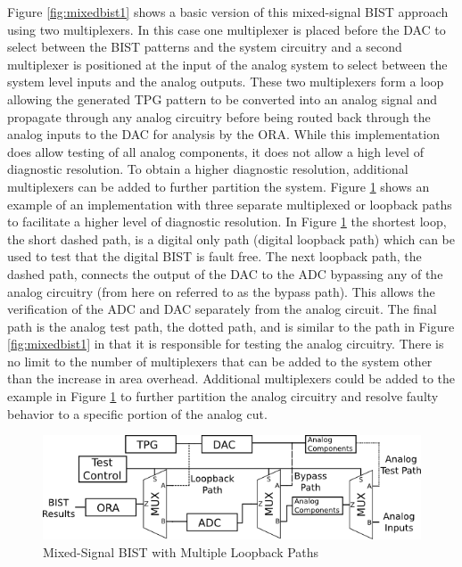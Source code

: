 \documentclass[12pt]{report}
\begin{document}
Figure \ref{fig:mixedbist1} shows a basic version of this mixed-signal BIST approach using two multiplexers.  In this case one multiplexer is placed before the DAC to select between the BIST patterns and the system circuitry and a second multiplexer is positioned at the input of the analog system to select between the system level inputs and the analog outputs.  These two multiplexers form a loop allowing the generated TPG pattern to be converted into an analog signal and propagate through any analog circuitry before being routed back through the analog inputs to the DAC for analysis by the ORA.  While this implementation does allow testing of all analog components, it does not allow a high level of diagnostic resolution\cite{syschip}.  To obtain a higher diagnostic resolution, additional multiplexers can be added to further partition the system. Figure \ref{fig:mixedbist_paths} shows an example of an implementation with three separate multiplexed or loopback paths to facilitate a higher level of diagnostic resolution.  In Figure \ref{fig:mixedbist_paths} the shortest loop, the short dashed path, is a digital only path (digital loopback path) which can be used to test that the digital BIST is fault free.  The next loopback path, the dashed path, connects the output of the DAC to the ADC bypassing any of the analog circuitry (from here on referred to as the bypass path).  This allows the verification of the ADC and DAC separately from the analog circuit.  The final path is the analog test path, the dotted path, and is similar to the path in Figure \ref{fig:mixedbist1} in that it is responsible for testing the analog circuitry.  There is no limit to the number of multiplexers that can be added to the system other than the increase in area overhead\cite{syschip}.  Additional multiplexers could be added to the example in Figure \ref{fig:mixedbist_paths} to further partition the analog circuitry and resolve faulty behavior to a specific portion of the analog cut.
\begin{figure}
	\begin{center}
		\includegraphics[scale=1]{images/mixedbist-paths}
	\end{center}
	\caption{Mixed-Signal BIST with Multiple Loopback Paths}
	\label{fig:mixedbist_paths}
\end{figure}
\end{document}
